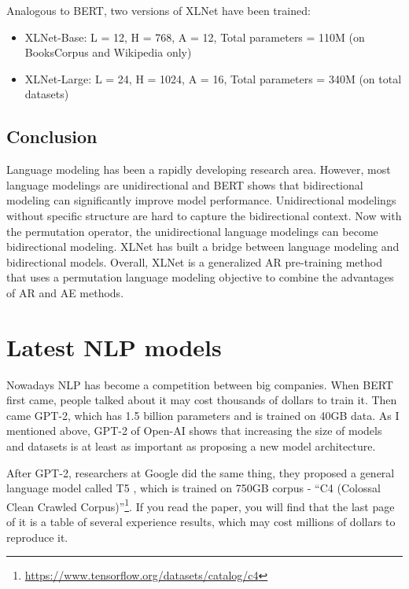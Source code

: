 \documentclass[]{krantz}
\providecommand{\tightlist}{%
  \setlength{\itemsep}{0pt}\setlength{\parskip}{0pt}}
\renewcommand{\href}[2]{#2\footnote{\url{#1}}}
\begin{document}
Analogous to BERT, two versions of XLNet have been trained:

\begin{itemize}
\tightlist
\item
  XLNet-Base: L = 12, H = 768, A = 12, Total parameters = 110M (on BooksCorpus and Wikipedia only)
\item
  XLNet-Large: L = 24, H = 1024, A = 16, Total parameters = 340M (on total datasets)
\end{itemize}

\hypertarget{conclusion-1}{%
\subsection{Conclusion}\label{conclusion-1}}

Language modeling has been a rapidly developing research area. However, most language modelings are unidirectional and BERT \citet{bert} shows that bidirectional modeling can significantly improve model performance. Unidirectional modelings without specific structure are hard to capture the bidirectional context. Now with the permutation operator, the unidirectional language modelings can become bidirectional modeling. XLNet has built a bridge between language modeling and bidirectional models. Overall, XLNet is a generalized AR pre-training method that uses a permutation language modeling objective to combine the advantages of AR and AE methods.

\hypertarget{latest-nlp-models}{%
\section{Latest NLP models}\label{latest-nlp-models}}

Nowadays NLP has become a competition between big companies. When BERT first came, people talked about it may cost thousands of dollars to train it. Then came GPT-2, which has 1.5 billion parameters and is trained on 40GB data. As I mentioned above, GPT-2 of Open-AI shows that increasing the size of models and datasets is at least as important as proposing a new model architecture.

After GPT-2, researchers at Google did the same thing, they proposed a general language model called T5 \citet{raffel2019exploring}, which is trained on 750GB corpus - \href{https://www.tensorflow.org/datasets/catalog/c4}{``C4 (Colossal Clean Crawled Corpus)''}. If you read the paper, you will find that the last page of it is a table of several experience results, which may cost millions of dollars to reproduce it.
\end{document}
